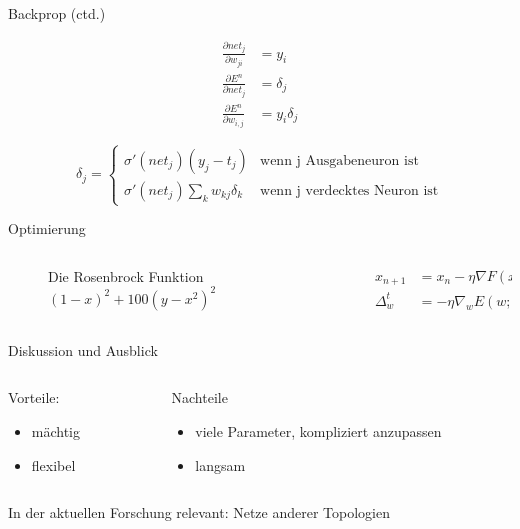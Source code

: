 \documentclass[10pt, compress, xetex]{beamer}
\begin{document}
\begin{frame}{Backprop (ctd.)}


\begin{align}
  \frac{\partial net_j }{\partial w_{ji}} & =  y_i
  \\
  \frac{\partial E^n}{\partial net_j} & =  \delta_j
  \\
  \frac{\partial E^n}{\partial w_{i,j}} &= y_i  \delta_j
\end{align}



\begin{equation}
\label{eq:backpropagation}
\delta_j =  \begin{cases}
               \sigma ' (net_j) (y_j - t_j)           & \text{wenn j Ausgabeneuron ist}\\
               \sigma ' (net_j) \sum_k w_{kj} \delta_k     & \text{wenn j verdecktes Neuron ist}
           \end{cases} 
\end{equation} 
\end{frame}
\begin{frame}{Optimierung}


\begin{columns}[c]
  \begin{column}[c]{.3\textwidth}
  \begin{figure}[ht!]
  \centering
  \caption{Die Rosenbrock Funktion $(1-x)^2 + 100(y - x^2)^2$}

\end{figure}
  \end{column}  
  \begin{column}[c]{.7\textwidth}
    \begin{align}
    x_{n+1} &=x_n- \eta  \nabla F(x_n) \\
    \Delta_w^t &= - \eta  \nabla_w E(w;t)
    \end{align}
    \end{column}
\end{columns} 
\end{frame}

\begin{frame}{Diskussion und Ausblick}
\begin{columns}[T]
  \begin{column}[T]{.5\textwidth}
        Vorteile:
        \begin{itemize}
          \item mächtig
          \item flexibel
        \end{itemize}
  \end{column}  
  \begin{column}[T]{.5\textwidth}
        Nachteile
        \begin{itemize}
          \item viele Parameter, kompliziert anzupassen
          \item langsam
        \end{itemize}
    \end{column}
\end{columns} 
In der \alert{aktuellen} Forschung relevant: Netze anderer Topologien 
\end{frame}
\end{document}
